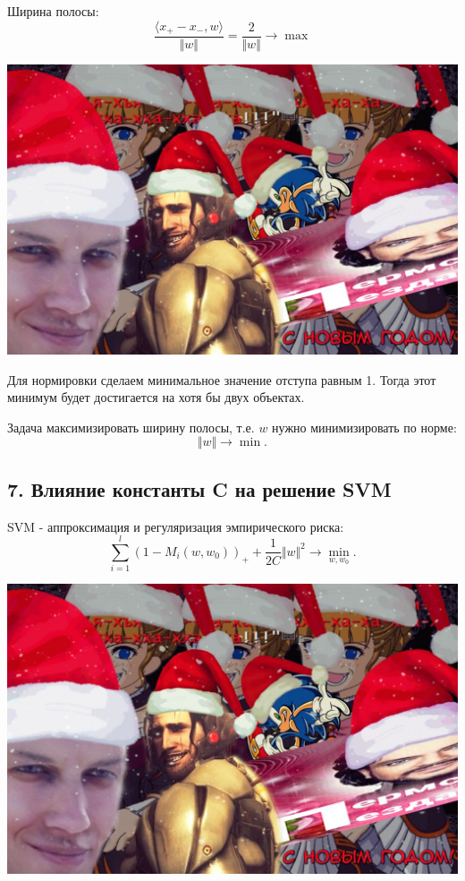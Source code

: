 Ширина полосы:
$$\frac{\langle x_+ - x_-, w \rangle}{\Vert w \Vert} = \frac{2}{\Vert w \Vert} \rightarrow \max$$

\includegraphics[scale=0.3]{figures/samplefigure.jpg}

Для нормировки сделаем минимальное значение отступа равным 1.
Тогда этот минимум будет достигается на хотя бы двух объектах.

Задача максимизировать ширину полосы, т.е. $w$ нужно минимизировать по
норме:
$${\Vert w \Vert} \rightarrow \min.$$

\subsection{7. Влияние константы C на решение SVM}

SVM - аппроксимация и регуляризация эмпирического риска:
$$\sum_{i=1}^{l}{\left( 1 - M_i{(w, w_0)} \right)}_{+} + \frac{1}{2C} {\Vert w \Vert}^2 \rightarrow \min_{w, w_0}.$$

\includegraphics[scale=0.3]{figures/samplefigure.jpg}

